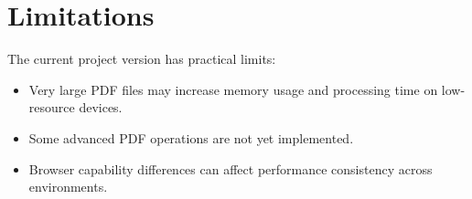 \section{Limitations}
The current project version has practical limits:
\begin{itemize}
  \item Very large PDF files may increase memory usage and processing time on low-resource devices.
  \item Some advanced PDF operations are not yet implemented.
  \item Browser capability differences can affect performance consistency across environments.
\end{itemize}
